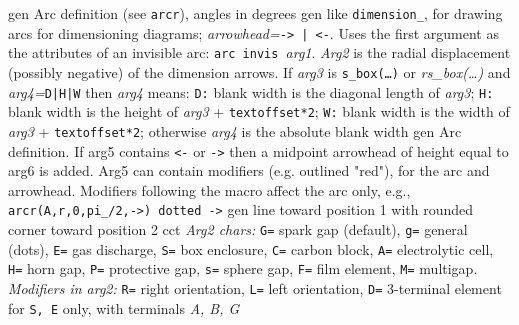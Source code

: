   {gen}
  {Arc definition (see {\tt arcr}), angles in degrees
    }
  {gen}
  {like {\tt dimension\_}, for drawing arcs for dimensioning diagrams;
      {\sl arrowhead=}{\tt -> | <-}. Uses the first argument as the attributes
      of an invisible arc: {\tt arc invis }{\sl arg1}.  {\sl Arg2} is the
      radial displacement (possibly negative) of the dimension arrows.
      If {\sl arg3} is {\tt s\_box(\ldots)} or {\sl rs\_box(\ldots)} and
      {\sl arg4=}{\tt D|H|W} then {\sl arg4} means:
      {\tt D:} blank width is the diagonal length of {\sl arg3};
      {\tt H:} blank width is the height of {\sl arg3} + {\tt textoffset*2};
      {\tt W:} blank width is the width of {\sl arg3} + {\tt textoffset*2};
      otherwise {\sl arg4} is the absolute blank width}
  {gen}
  {Arc definition.  If arg5 contains {\tt <-} or {\tt ->} then a midpoint
    arrowhead of height equal to arg6 is added. Arg5 can contain modifiers
    (e.g. outlined "red"), for the arc and arrowhead.  Modifiers following
    the macro affect the arc only,
    e.g., {\tt arcr(A,r,0,pi\_/2,->) dotted ->}
   }
  {gen}
  {line toward position 1 with rounded corner toward position 2}
  {cct}
{
                                 {\sl Arg2 chars:}
                                   {\tt G=} spark gap (default),
                                   {\tt g=} general (dots),
                                   {\tt E=} gas discharge,
                                   {\tt S=} box enclosure,
                                   {\tt C=} carbon block,
                                   {\tt A=} electrolytic cell,
                                   {\tt H=} horn gap,
                                   {\tt P=} protective gap,
                                   {\tt s=} sphere gap,
                                   {\tt F=} film element,
                                   {\tt M=} multigap.
                                 {\sl Modifiers in arg2:}
                                   {\tt R=} right orientation,
                                   {\tt L=} left orientation,
                                   {\tt D=} 3-terminal element for {\tt S, E}
                                      only, with terminals {\sl A, B, G}
   }
